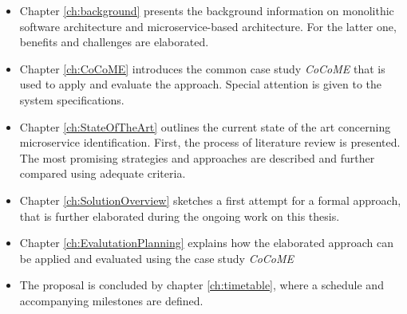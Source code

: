 \begin{itemize}
	\item  Chapter \ref{ch:background} presents the background information on monolithic software architecture and microservice-based architecture. For the latter one, benefits and challenges are elaborated. 
	\item Chapter \ref{ch:CoCoME} introduces the common case study \textit{CoCoME} that is used to apply and evaluate the approach. Special attention is given to the system specifications.
	\item Chapter \ref{ch:StateOfTheArt} outlines the current state of the art concerning microservice identification. First, the process of literature review is presented. The most promising strategies and approaches are described and further compared using adequate criteria.
	\item Chapter \ref{ch:SolutionOverview} sketches a first attempt for a formal approach, that is further elaborated during the ongoing work on this thesis.
	\item Chapter \ref{ch:EvalutationPlanning} explains how the elaborated approach can be applied and evaluated using the case study \textit{CoCoME}
	\item The proposal is concluded by chapter \ref{ch:timetable}, where a schedule and accompanying milestones are defined.
\end{itemize}











